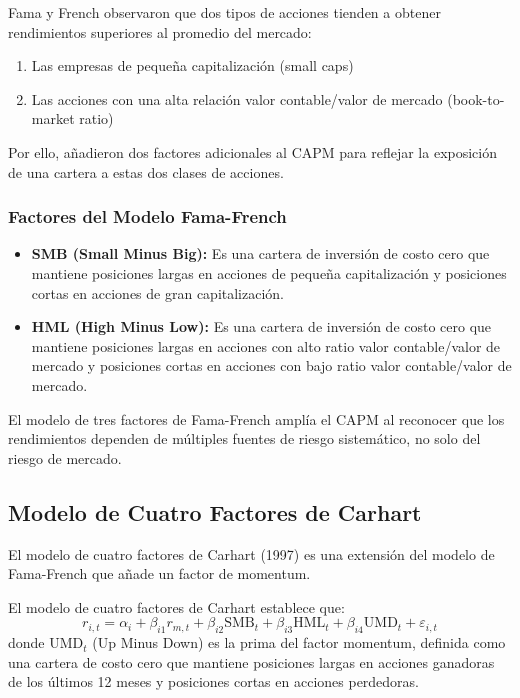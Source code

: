 Fama y French observaron que dos tipos de acciones tienden a obtener rendimientos superiores al promedio del mercado:
\begin{enumerate}
\item Las empresas de pequeña capitalización (small caps)
\item Las acciones con una alta relación valor contable/valor de mercado (book-to-market ratio)
\end{enumerate}

Por ello, añadieron dos factores adicionales al CAPM para reflejar la exposición de una cartera a estas dos clases de acciones.

\subsubsection{Factores del Modelo Fama-French}

\begin{itemize}
\item \textbf{SMB (Small Minus Big):} Es una cartera de inversión de costo cero que mantiene posiciones largas en acciones de pequeña capitalización y posiciones cortas en acciones de gran capitalización.

\item \textbf{HML (High Minus Low):} Es una cartera de inversión de costo cero que mantiene posiciones largas en acciones con alto ratio valor contable/valor de mercado y posiciones cortas en acciones con bajo ratio valor contable/valor de mercado.
\end{itemize}

El modelo de tres factores de Fama-French amplía el CAPM al reconocer que los rendimientos dependen de múltiples fuentes de riesgo sistemático, no solo del riesgo de mercado.

\subsection{Modelo de Cuatro Factores de Carhart}

El modelo de cuatro factores de Carhart (1997) es una extensión del modelo de Fama-French que añade un factor de momentum.

\begin{definicion}
El modelo de cuatro factores de Carhart establece que:
\begin{equation}
r_{i,t} = \alpha_i + \beta_{i1} r_{m,t} + \beta_{i2} \text{SMB}_t + \beta_{i3} \text{HML}_t + \beta_{i4} \text{UMD}_t + \varepsilon_{i,t}
\end{equation}
donde $\text{UMD}_t$ (Up Minus Down) es la prima del factor momentum, definida como una cartera de costo cero que mantiene posiciones largas en acciones ganadoras de los últimos 12 meses y posiciones cortas en acciones perdedoras.
\end{definicion}

